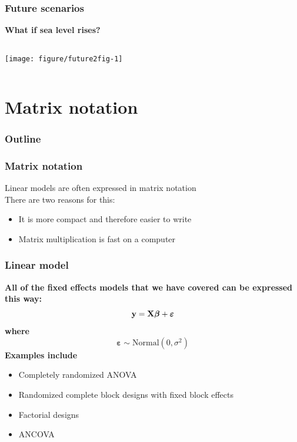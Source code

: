 \documentclass[color=usenames,dvipsnames]{beamer}\usepackage[]{graphicx}\usepackage[]{color}
\begin{document}
\begin{frame}[fragile]
  \frametitle{Future scenarios}
  {\bf What if sea level rises? \par}
  \scriptsize
  \pause


\begin{columns}
  \column{\dimexpr\paperwidth-10pt}
  \texttt{[image: figure/future2fig-1]}
\end{columns}
\end{frame}















\section{Matrix notation}


\begin{frame}
  \frametitle{Outline}
  \LARGE
\end{frame}



\begin{frame}
  \frametitle{Matrix notation}
  Linear models are often expressed in matrix notation \\
  \vfill
  There are two reasons for this: \\
  \begin{itemize}%
    \item It is more compact and therefore easier to write
    \item Matrix multiplication is fast on a computer
  \end{itemize}
\end{frame}



\begin{frame}
  \frametitle{Linear model}
  {\bf All of the fixed effects models that we have covered can be
    expressed this way:}
  \[
  {\bf y} = {\bf X}{\bm \beta} + {\bm \varepsilon}
  \]
  {\bf where}
  \[
  {\bm \varepsilon} \sim \mbox{Normal}(0, \sigma^2)
  \]
  \pause
  \vfill
  {\bf Examples include} \\
  \begin{itemize}
    \item Completely randomized ANOVA
    \item Randomized complete block designs with fixed block effects
    \item Factorial designs
    \item ANCOVA
  \end{itemize}
\end{frame}
\end{document}

